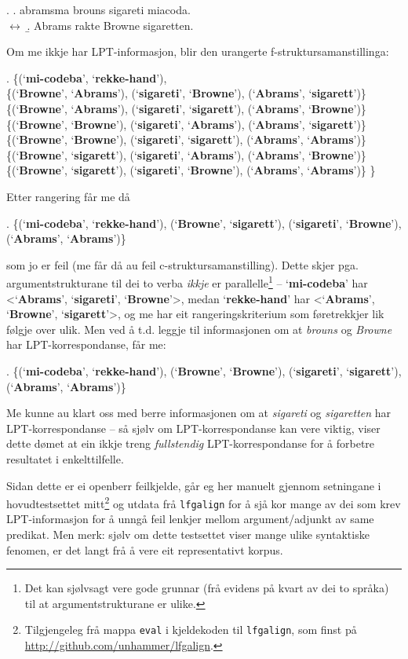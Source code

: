 \documentclass[12pt,a4paper,oneside,draft]{report}
\newcommand{\p}[1]{`\textbf{#1}'}
\begin{document}
\ex. \a. abramsma brouns sigareti miacoda.\\
     $\leftrightarrow$
     \b. Abrams rakte Browne sigaretten.
     
 Om me ikkje har LPT\hyp{}informasjon, blir den urangerte
 f\hyp{}struktursamanstillinga:

\ex. \{(\p{mi-codeba}, \p{rekke-hand}), \\
 \{(\p{Browne}, \p{Abrams}),   (\p{sigareti}, \p{Browne}),   (\p{Abrams}, \p{sigarett})\} \\
 \{(\p{Browne}, \p{Abrams}),   (\p{sigareti}, \p{sigarett}), (\p{Abrams}, \p{Browne})\} \\
 \{(\p{Browne}, \p{Browne}),   (\p{sigareti}, \p{Abrams}),   (\p{Abrams}, \p{sigarett})\} \\
 \{(\p{Browne}, \p{Browne}),   (\p{sigareti}, \p{sigarett}), (\p{Abrams}, \p{Abrams})\} \\
 \{(\p{Browne}, \p{sigarett}), (\p{sigareti}, \p{Abrams}),   (\p{Abrams}, \p{Browne})\} \\
 \{(\p{Browne}, \p{sigarett}), (\p{sigareti}, \p{Browne}),   (\p{Abrams}, \p{Abrams})\} \}

 Etter rangering får me då 

\ex. \{(\p{mi-codeba}, \p{rekke-hand}), (\p{Browne}, \p{sigarett}), (\p{sigareti}, \p{Browne}), (\p{Abrams}, \p{Abrams})\} 

 som jo er feil (me får då au feil c\hyp{}struktursamanstilling). Dette
 skjer pga. argumentstrukturane til dei to verba \emph{ikkje} er
 parallelle\footnote{Det kan sjølvsagt vere gode grunnar (frå evidens på kvart av
        dei to språka) til at argumentstrukturane er ulike. } -- \p{mi-codeba} har <\p{Abrams}, \p{sigareti},
 \p{Browne}>, medan \p{rekke-hand} har <\p{Abrams}, \p{Browne},
 \p{sigarett}>, og me har eit rangeringskriterium som føretrekkjer lik
 følgje over ulik. Men ved å t.d. leggje til informasjonen om at
 \emph{brouns} og \emph{Browne} har LPT\hyp{}korrespondanse, får me:

\ex. \{(\p{mi-codeba}, \p{rekke-hand}), (\p{Browne}, \p{Browne}), (\p{sigareti}, \p{sigarett}), (\p{Abrams}, \p{Abrams})\}

 Me kunne au klart oss med berre informasjonen om at \emph{sigareti} og
 \emph{sigaretten} har LPT\hyp{}korrespondanse -- så sjølv om LPT\hyp{}korrespondanse
 kan vere viktig, viser dette dømet at ein ikkje treng \emph{fullstendig}
 LPT\hyp{}korrespondanse for å forbetre resultatet i enkelttilfelle.

 Sidan dette er ei openberr feilkjelde, går eg her manuelt gjennom
 setningane i hovudtestsettet mitt\footnote{Tilgjengeleg frå mappa \texttt{eval} i kjeldekoden til \texttt{lfgalign},
        som finst på \href{http://github.com/unhammer/lfgalign}{http://github.com/unhammer/lfgalign}. } og utdata frå \texttt{lfgalign} for
 å sjå kor mange av dei som krev LPT\hyp{}informasjon for å unngå feil
 lenkjer mellom argument/adjunkt av same predikat. Men merk: sjølv om
 dette testsettet viser mange ulike syntaktiske fenomen, er det langt
 frå å vere eit representativt korpus.
\end{document}
